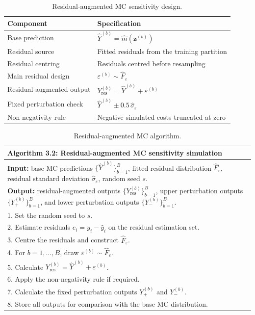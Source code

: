 \begin{table}[H]
\centering
\small
\renewcommand{\arraystretch}{1.15}
\begin{tabular}{p{}p{}}
\toprule
\textbf{Component} & \textbf{Specification} \\
\midrule
Base prediction & $\widehat{Y}^{(b)} = \widehat{m}(\mathbf{z}^{(b)})$ \\
Residual source & Fitted residuals from the training partition \\
Residual centring & Residuals centred before resampling \\
Main residual design & $\varepsilon^{(b)} \sim \widehat{F}_{\varepsilon}$ \\
Residual-augmented output & $Y_{\mathrm{res}}^{(b)} = \widehat{Y}^{(b)}+\varepsilon^{(b)}$ \\
Fixed perturbation check & $\widehat{Y}^{(b)} \pm 0.5\,\widehat{\sigma}_{\varepsilon}$ \\
Non-negativity rule & Negative simulated costs truncated at zero \\
\bottomrule
\end{tabular}
\caption{Residual-augmented MC sensitivity design.}
\label{tab:residual_augmented_design_ch3}
\end{table}

\begin{table}[H]
\centering
\small
\renewcommand{\arraystretch}{1.15}
\begin{tabular}{p{}}
\toprule
\textbf{Algorithm 3.2: Residual-augmented MC sensitivity simulation} \\
\midrule
\textbf{Input:} base MC predictions
$\{\widehat{Y}^{(b)}\}_{b=1}^{B}$, fitted residual distribution
$\widehat{F}_{\varepsilon}$, residual standard deviation
$\widehat{\sigma}_{\varepsilon}$, random seed $s$. \\[3pt]

\textbf{Output:} residual-augmented outputs
$\{Y_{\mathrm{res}}^{(b)}\}_{b=1}^{B}$, upper perturbation outputs
$\{Y_{+}^{(b)}\}_{b=1}^{B}$, and lower perturbation outputs
$\{Y_{-}^{(b)}\}_{b=1}^{B}$. \\[3pt]

1. Set the random seed to $s$. \\
2. Estimate residuals $e_i = y_i-\widehat{y}_i$ on the residual estimation set. \\
3. Centre the residuals and construct $\widehat{F}_{\varepsilon}$. \\
4. For $b=1,\ldots,B$, draw $\varepsilon^{(b)} \sim \widehat{F}_{\varepsilon}$. \\
5. Calculate $Y_{\mathrm{res}}^{(b)} = \widehat{Y}^{(b)}+\varepsilon^{(b)}$. \\
6. Apply the non-negativity rule if required. \\
7. Calculate the fixed perturbation outputs $Y_{+}^{(b)}$ and $Y_{-}^{(b)}$. \\
8. Store all outputs for comparison with the base MC distribution. \\
\bottomrule
\end{tabular}
\caption{Residual-augmented MC algorithm.}
\label{tab:residual_augmented_algorithm_ch3}
\end{table}


